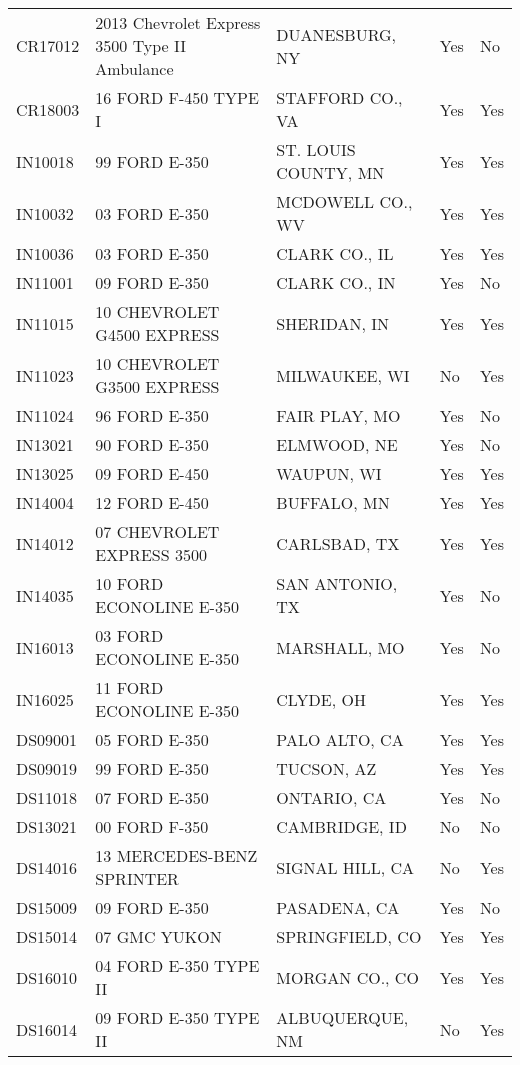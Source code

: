 \begin{appendices}
\begin{table}[]
\begin{tabular}{lllll}
CR17012 & 2013 Chevrolet   Express 3500 Type II Ambulance & DUANESBURG, NY & Yes & No \\
CR18003 & 16 FORD F-450 TYPE I & STAFFORD CO., VA & Yes & Yes \\
IN10018 & 99 FORD E-350 & ST. LOUIS COUNTY, MN & Yes & Yes \\
IN10032 & 03 FORD E-350 & MCDOWELL CO., WV & Yes & Yes \\
IN10036 & 03 FORD E-350 & CLARK CO., IL & Yes & Yes \\
IN11001 & 09 FORD E-350 & CLARK CO., IN & Yes & No \\
IN11015 & 10 CHEVROLET G4500   EXPRESS & SHERIDAN, IN & Yes & Yes \\
IN11023 & 10 CHEVROLET G3500   EXPRESS & MILWAUKEE, WI & No & Yes \\
IN11024 & 96 FORD E-350 & FAIR PLAY, MO & Yes & No \\
IN13021 & 90 FORD E-350 & ELMWOOD, NE & Yes & No \\
IN13025 & 09 FORD E-450 & WAUPUN, WI & Yes & Yes \\
IN14004 & 12 FORD E-450 & BUFFALO, MN & Yes & Yes \\
IN14012 & 07 CHEVROLET EXPRESS   3500 & CARLSBAD, TX & Yes & Yes \\
IN14035 & 10 FORD ECONOLINE   E-350 & SAN ANTONIO, TX & Yes & No \\
IN16013 & 03 FORD ECONOLINE   E-350 & MARSHALL, MO & Yes & No \\
IN16025 & 11 FORD ECONOLINE   E-350 & CLYDE, OH & Yes & Yes \\
DS09001 & 05 FORD E-350 & PALO ALTO, CA & Yes & Yes \\
DS09019 & 99 FORD E-350 & TUCSON, AZ & Yes & Yes \\
DS11018 & 07 FORD E-350 & ONTARIO, CA & Yes & No \\
DS13021 & 00 FORD F-350 & CAMBRIDGE, ID & No & No \\
DS14016 & 13 MERCEDES-BENZ   SPRINTER & SIGNAL HILL, CA & No & Yes \\
DS15009 & 09 FORD E-350 & PASADENA, CA & Yes & No \\
DS15014 & 07 GMC YUKON & SPRINGFIELD, CO & Yes & Yes \\
DS16010 & 04 FORD E-350 TYPE II & MORGAN CO., CO & Yes & Yes \\
DS16014 & 09 FORD E-350 TYPE II & ALBUQUERQUE, NM & No & Yes
\end{tabular}
\end{table}


\end{appendices}

